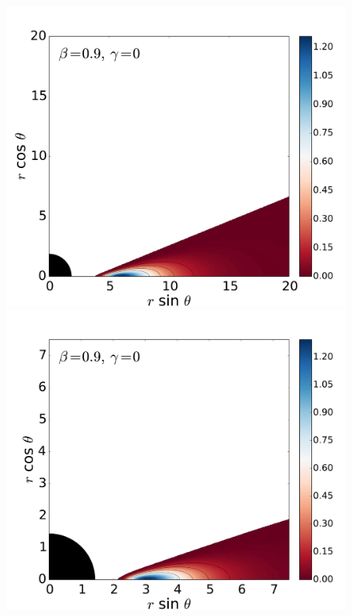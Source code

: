 \documentclass[]{aa}
\begin{document}
\begin{figure}
\includegraphics[scale=0.14]{figures/fig2_5_1.pdf}
\hspace{-0.3cm}
\includegraphics[scale=0.14]{figures/fig2_5_2.pdf}
\hspace{-0.2cm}

\end{figure}
\end{document}
